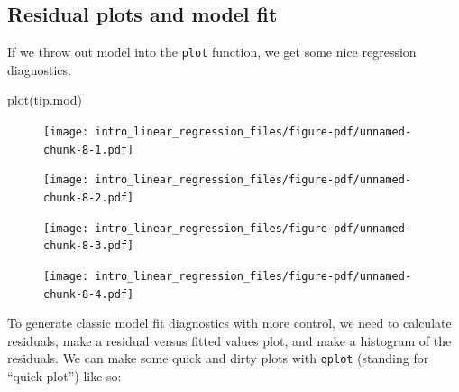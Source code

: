 \documentclass[
  letterpaper,
  DIV=11,
  numbers=noendperiod]{scrreprt}
\newenvironment{Shaded}{\begin{snugshade}}{\end{snugshade}}
\newcommand{\FunctionTok}[1]{\textcolor[rgb]{0.02,0.16,0.49}{#1}}
\newcommand{\NormalTok}[1]{\textcolor[rgb]{0.00,0.44,0.13}{#1}}
\newcommand{\SpecialCharTok}[1]{\textcolor[rgb]{0.25,0.44,0.63}{#1}}
\begin{document}
\hypertarget{residual-plots-and-model-fit}{%
\subsection{Residual plots and model
fit}\label{residual-plots-and-model-fit}}

If we throw out model into the \texttt{plot} function, we get some nice
regression diagnostics.

\begin{Shaded}
\begin{Highlighting}[]
\FunctionTok{plot}\NormalTok{(tip.mod)}
\end{Highlighting}
\end{Shaded}

\begin{figure}[H]

{\centering \texttt{[image: intro\_linear\_regression\_files/figure-pdf/unnamed-chunk-8-1.pdf]}

}

\end{figure}

\begin{figure}[H]

{\centering \texttt{[image: intro\_linear\_regression\_files/figure-pdf/unnamed-chunk-8-2.pdf]}

}

\end{figure}

\begin{figure}[H]

{\centering \texttt{[image: intro\_linear\_regression\_files/figure-pdf/unnamed-chunk-8-3.pdf]}

}

\end{figure}

\begin{figure}[H]

{\centering \texttt{[image: intro\_linear\_regression\_files/figure-pdf/unnamed-chunk-8-4.pdf]}

}

\end{figure}

To generate classic model fit diagnostics with more control, we need to
calculate residuals, make a residual versus fitted values plot, and make
a histogram of the residuals. We can make some quick and dirty plots
with \texttt{qplot} (standing for ``quick plot'') like so:

\begin{Shaded}
\end{Shaded}
\end{document}
